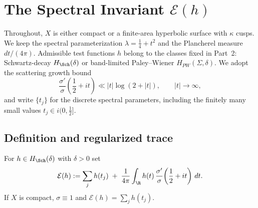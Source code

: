 
\section{The Spectral Invariant \texorpdfstring{$\mathcal{E}(h)$}{E(h)}}
\label{sec:part3-E-invariant}

\noindent
Throughout, $X$ is either compact or a finite-area hyperbolic surface with $\kappa$ cusps.
We keep the spectral parameterization $\lambda=\frac14+t^2$ and the Plancherel measure $dt/(4\pi)$.
Admissible test functions $h$ belong to the classes fixed in Part~2:
Schwartz-decay $H_{\Sch}(\delta)$ or band-limited Paley–Wiener $H_{PW}(\Sigma,\delta)$.
We adopt the scattering growth bound
\begin{equation}\label{eq:sigma-growth-part3}
  \frac{\sigma'}{\sigma}\!\left(\frac12+it\right) \ll |t|\log(2+|t|),
  \qquad |t|\to\infty,
\end{equation}
and write $\{t_j\}$ for the discrete spectral parameters, including the finitely many small values
$t_j\in i(0,\frac12]$.

\subsection{Definition and regularized trace}
\label{subsec:part3-definition-regularized-trace}

\begin{definition}
\label{def:Eh}
For $h\in H_{\Sch}(\delta)$ with $\delta>0$ set
\[
  \mathcal{E}(h)
  := \sum_{j} h(t_j)
   \;+\; \frac{1}{4\pi}\int_{\R} h(t)\,
          \frac{\sigma'}{\sigma}\!\left(\frac12+it\right)\,dt.
\]
If $X$ is compact, $\sigma\equiv 1$ and $\mathcal{E}(h)=\sum_{j} h(t_j)$.
\end{definition}

